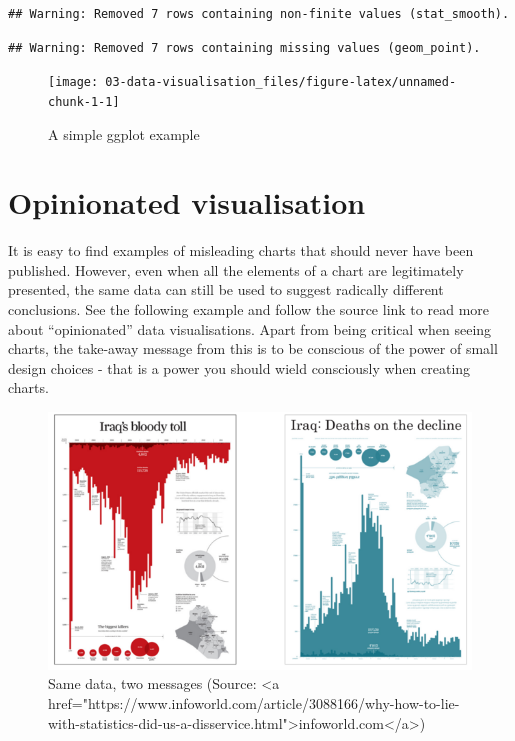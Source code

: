 \documentclass[
]{book}
\begin{document}
\begin{verbatim}
## Warning: Removed 7 rows containing non-finite values (stat_smooth).
\end{verbatim}

\begin{verbatim}
## Warning: Removed 7 rows containing missing values (geom_point).
\end{verbatim}

\begin{figure}

{\centering \texttt{[image: 03-data-visualisation\_files/figure-latex/unnamed-chunk-1-1]} 

}

\caption{A simple ggplot example}\label{fig:unnamed-chunk-1}
\end{figure}

\hypertarget{opinionated-visualisation}{%
\section{Opinionated visualisation}\label{opinionated-visualisation}}

It is easy to find examples of misleading charts that should never have been published. However, even when all the elements of a chart are legitimately presented, the same data can still be used to suggest radically different conclusions. See the following example and follow the source link to read more about ``opinionated'' data visualisations. Apart from being critical when seeing charts, the take-away message from this is to be conscious of the power of small design choices - that is a power you should wield consciously when creating charts.

\begin{figure}

{\centering \includegraphics[width=1\linewidth]{./images/iraq-bloody-toll} 

}

\caption{Same data, two messages (Source: <a href="https://www.infoworld.com/article/3088166/why-how-to-lie-with-statistics-did-us-a-disservice.html">infoworld.com</a>)}\label{fig:two-messages}
\end{figure}
\end{document}
